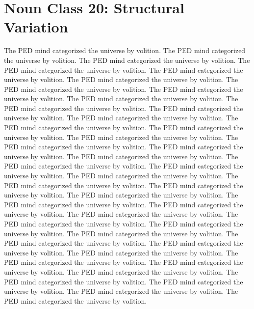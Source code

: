 \section{Noun Class 20: Structural Variation}
The PED mind categorized the universe by volition. The PED mind categorized the universe by volition. The PED mind categorized the universe by volition. The PED mind categorized the universe by volition. The PED mind categorized the universe by volition. The PED mind categorized the universe by volition. The PED mind categorized the universe by volition. The PED mind categorized the universe by volition. The PED mind categorized the universe by volition. The PED mind categorized the universe by volition. The PED mind categorized the universe by volition. The PED mind categorized the universe by volition. The PED mind categorized the universe by volition. The PED mind categorized the universe by volition. The PED mind categorized the universe by volition. The PED mind categorized the universe by volition. The PED mind categorized the universe by volition. The PED mind categorized the universe by volition. The PED mind categorized the universe by volition. The PED mind categorized the universe by volition. The PED mind categorized the universe by volition. The PED mind categorized the universe by volition. The PED mind categorized the universe by volition. The PED mind categorized the universe by volition. The PED mind categorized the universe by volition. The PED mind categorized the universe by volition. The PED mind categorized the universe by volition. The PED mind categorized the universe by volition. The PED mind categorized the universe by volition. The PED mind categorized the universe by volition. The PED mind categorized the universe by volition. The PED mind categorized the universe by volition. The PED mind categorized the universe by volition. The PED mind categorized the universe by volition. The PED mind categorized the universe by volition. The PED mind categorized the universe by volition. The PED mind categorized the universe by volition. The PED mind categorized the universe by volition. The PED mind categorized the universe by volition. The PED mind categorized the universe by volition. 

